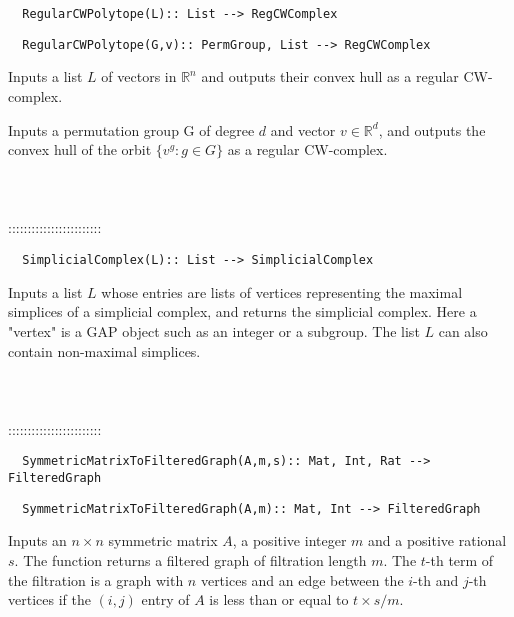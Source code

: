 \documentclass[a4paper,11pt]{report}
\begin{document}
{\begin{verbatim}  RegularCWPolytope(L):: List --> RegCWComplex
\end{verbatim}
 
\begin{verbatim}  RegularCWPolytope(G,v):: PermGroup, List --> RegCWComplex
\end{verbatim}


 

 Inputs a list $L$ of vectors in $\mathbb R^n$ and outputs their convex hull as a regular CW-complex. 

 Inputs a permutation group G of degree $d$ and vector $v\in \mathbb R^d$, and outputs the convex hull of the orbit $\{v^g : g\in G\}$ as a regular CW-complex. \\
 \\
 \\
 \\
 ::::::::::::::::::::::::\\
 
\begin{verbatim}  SimplicialComplex(L):: List --> SimplicialComplex
\end{verbatim}


 

Inputs a list $L$ whose entries are lists of vertices representing the maximal simplices of a
simplicial complex, and returns the simplicial complex. Here a "vertex" is a
GAP object such as an integer or a subgroup. The list $L$ can also contain non-maximal simplices. \\
 \\
 \\
 \\
 ::::::::::::::::::::::::\\
 
\begin{verbatim}  SymmetricMatrixToFilteredGraph(A,m,s):: Mat, Int, Rat --> FilteredGraph
\end{verbatim}
 
\begin{verbatim}  SymmetricMatrixToFilteredGraph(A,m):: Mat, Int --> FilteredGraph
\end{verbatim}


 

Inputs an $n \times n$ symmetric matrix $A$, a positive integer $m$ and a positive rational $s$. The function returns a filtered graph of filtration length $m$. The $t$-th term of the filtration is a graph with $n$ vertices and an edge between the $i$-th and $j$-th vertices if the $(i,j)$ entry of $A$ is less than or equal to $t \times s/m$. 

}
\end{document}

